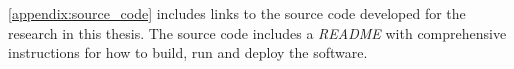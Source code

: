 

\autoref{appendix:source_code} includes links to the source code developed for the research in this thesis. The source code includes a \textit{README} with comprehensive instructions for how to build, run and deploy the software.




\cleardoublepage